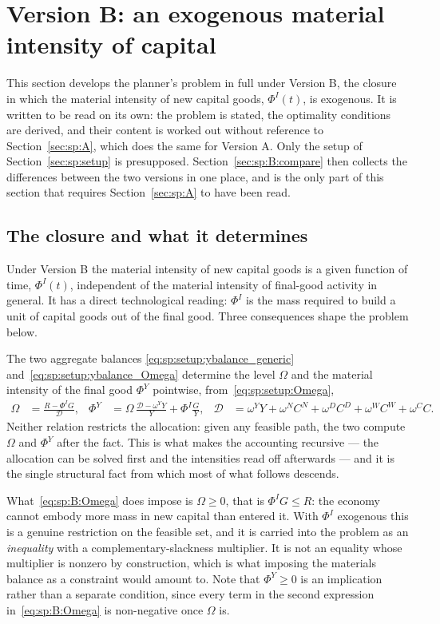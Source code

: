 ﻿\section{Version B: an exogenous material intensity of capital}\label{sec:sp:B}

This section develops the planner's problem in full under Version B, the closure in which the material
intensity of new capital goods, $\Phi^I(t)$, is exogenous. It is written to be read on its own: the
problem is stated, the optimality conditions are derived, and their content is worked out without
reference to Section~\ref{sec:sp:A}, which does the same for Version A. Only the setup of
Section~\ref{sec:sp:setup} is presupposed. Section~\ref{sec:sp:B:compare} then collects the differences
between the two versions in one place, and is the only part of this section that requires
Section~\ref{sec:sp:A} to have been read.


\subsection{The closure and what it determines}\label{sec:sp:B:closure}

Under Version B the material intensity of new capital goods is a given function of time, $\Phi^I(t)$,
independent of the material intensity of final-good activity in general. It has a direct technological
reading: $\Phi^I$ is the mass required to build a unit of capital goods out of the final good. Three
consequences shape the problem below.

 The two aggregate balances
\eqref{eq:sp:setup:ybalance_generic} and~\eqref{eq:sp:setup:ybalance_Omega} determine the level $\Omega$
and the material intensity of the final good $\Phi^Y$ pointwise, from~\eqref{eq:sp:setup:Omega},
\begin{align}
\Omega &= \frac{R-\Phi^IG}{\mathcal D},
&
\Phi^Y &= \Omega\,\frac{\mathcal D-\omega^YY}{Y}+\Phi^I\frac{G}{Y},
&
\mathcal D &= \omega^YY+\omega^{N}C^N+\omega^{D}C^D+\omega^WC^W+\omega^CC .
\label{eq:sp:B:Omega}
\end{align}
Neither relation restricts the allocation: given any feasible path, the two compute $\Omega$ and
$\Phi^Y$ after the fact. This is what makes the accounting recursive --- the allocation can be solved
first and the intensities read off afterwards --- and it is the single structural fact from which most
of what follows descends.

 What~\eqref{eq:sp:B:Omega} does impose is $\Omega\ge0$,
that is $\Phi^IG\le R$: the economy cannot embody more mass in new capital than entered it. With
$\Phi^I$ exogenous this is a genuine restriction on the feasible set, and it is carried into the
problem as an \emph{inequality} with a complementary-slackness multiplier. It is not an equality
whose multiplier is nonzero by construction, which is what imposing the materials balance as a
constraint would amount to. Note that $\Phi^Y\ge0$ is an implication rather than a separate condition,
since every term in the second expression in~\eqref{eq:sp:B:Omega} is non-negative once $\Omega$ is.

